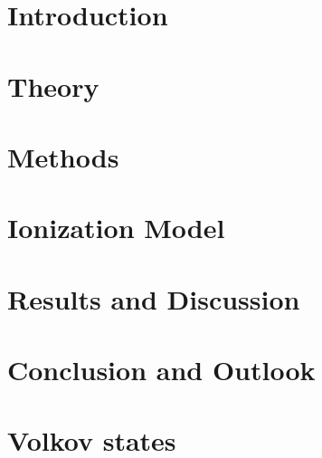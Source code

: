 \documentclass[12pt, twoside]{report}
\begin{document}

\cleardoublepage

\cleardoublepage


\setcounter{page}{1}


\begin{abstract}
    
\end{abstract}


\tableofcontents
\cleardoublepage


\listoffigures
\cleardoublepage


\setcounter{page}{1}


\chapter{Introduction}

\cleardoublepage


\chapter{Theory}

\cleardoublepage


\chapter{Methods}

\cleardoublepage


\chapter{Ionization Model}

\cleardoublepage


\chapter{Results and Discussion}

\cleardoublepage


\chapter{Conclusion and Outlook}

\cleardoublepage


\appendix
\chapter{Volkov states}

\cleardoublepage
\end{document}
